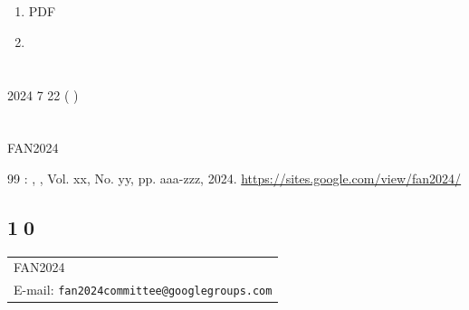 \documentclass{article}
\begin{document}
\section{ }
 
\begin{enumerate}
\item  PDF  
\item   
\end{enumerate}

\section{ }
2024 7 22 ( ) 

\section*{ }
 FAN2024 

\begin{thebibliography}{99}
 :  ,  , Vol. xx, No. yy, pp. aaa-zzz, 2024. \url{https://sites.google.com/view/fan2024/}
\end{thebibliography}
\vspace{-1mm}\par\noindent
\subsection*{ { \textcircled{10} }}\noindent
\begin{tabular}{l}
FAN2024  \\
E-mail: {\tt  fan2024committee@googlegroups.com}
\end{tabular}
\end{document}
